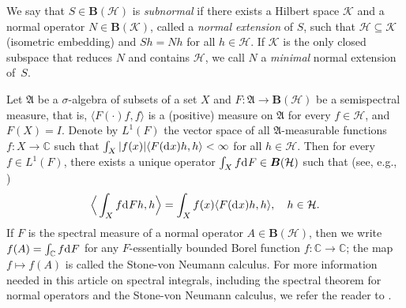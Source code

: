 \documentclass[reqno]{amsproc}
\numberwithin{equation}{section}
\theoremstyle{remark}
\newcommand*{\hh}{\mathcal{H}}
\newcommand*{\is}[2]{\langle#1,#2\rangle}
\newcommand*{\kk}{\mathcal{K}}
\newcommand*{\comp}{\mathbb{C}}
\newcommand*{\cbb}{\comp}
\newcommand*{\D}{\mathrm{d\hspace{.1ex}}}
\theoremstyle{definition}
\newcommand*{\ogr}{\boldsymbol{B}}
\begin{document}
We say that $S\in \ogr(\hh)$ is {\em subnormal} if
there exists a Hilbert space $\kk$ and a normal
operator $N\in \ogr(\kk)$, called a {\em normal
extension} of $S$, such that $\hh\subseteq \kk$
(isometric embedding) and $Sh=Nh$ for all $h\in \hh$.
If $\kk$ is the only closed subspace that reduces $N$
and contains $\hh$, we call $N$ a {\em minimal} normal
extension of~$S$.

Let $\mathfrak{A}$ be a $\sigma$-algebra of subsets of
a set $X$ and $F\colon \mathfrak{A} \to \ogr(\hh)$ be
a semispectral measure, that is, $\is{F(\cdot)f}{f}$
is a (positive) measure on $\mathfrak{A}$ for every $f
\in \hh$, and $F(X)=I$. Denote by $L^1(F)$ the vector
space of all $\mathfrak{A}$-measurable functions
$f\colon X \to \cbb$ such that $\int_{X} |f(x)|
\langle F(\D x)h, h\rangle < \infty$ for all $h\in
\hh$. Then for every $f\in L^1(F)$, there exists a
unique operator $\int_X f \D F \in \ogr(\hh)$ such
that (see, e.g., \cite[Appendix]{Sto92})
   \begin{align*}
\Big\langle\int_X f \D F h, h\Big\rangle =
\int_X f(x) \langle F(\D x)h, h\rangle,
\quad h\in\hh.
   \end{align*}
If $F$ is the spectral measure of a normal operator
$A\in \ogr(\hh)$, then we write $f(A)=\int_{\cbb} f \D
F$ for any $F$-essentially bounded Borel function
$f\colon \cbb \to \cbb$; the map $f \mapsto f(A)$ is
called the Stone-von Neumann calculus. For more
information needed in this article on spectral
integrals, including the spectral theorem for normal
operators and the Stone-von Neumann calculus, we refer
the reader to \cite{Rud73,Bir-Sol87}.
\end{document}
